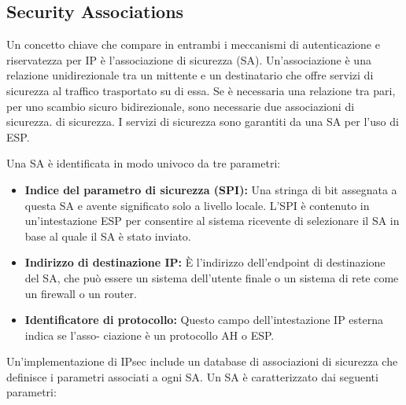 \subsection{Security Associations}
Un concetto chiave che compare in entrambi i meccanismi di autenticazione e riservatezza per IP è l'associazione di sicurezza (SA). Un'associazione è una relazione unidirezionale tra un mittente e un destinatario che offre servizi di sicurezza al traffico trasportato su di essa. Se è necessaria una relazione tra pari, per uno scambio sicuro bidirezionale, sono necessarie due associazioni di sicurezza. di sicurezza. I servizi di sicurezza sono garantiti da una SA per l'uso di ESP.

\singlespacing

Una SA è identificata in modo univoco da tre parametri:

\begin{itemize}
    \item \textbf{Indice del parametro di sicurezza (SPI):} Una stringa di bit assegnata a questa SA e avente significato solo a livello locale. L'SPI è contenuto in un'intestazione ESP per consentire al sistema ricevente di selezionare il SA in base al quale il SA è stato inviato.
    
    \item \textbf{Indirizzo di destinazione IP:} È l'indirizzo dell'endpoint di destinazione del SA, che può essere un sistema dell'utente finale o un sistema di rete come un firewall o un router.
    
    \item \textbf{Identificatore di protocollo:} Questo campo dell'intestazione IP esterna indica se l'asso- ciazione è un protocollo AH o ESP.
\end{itemize}
Un'implementazione di IPsec include un database di associazioni di sicurezza che definisce i parametri associati a ogni SA. Un SA è caratterizzato dai seguenti parametri:


